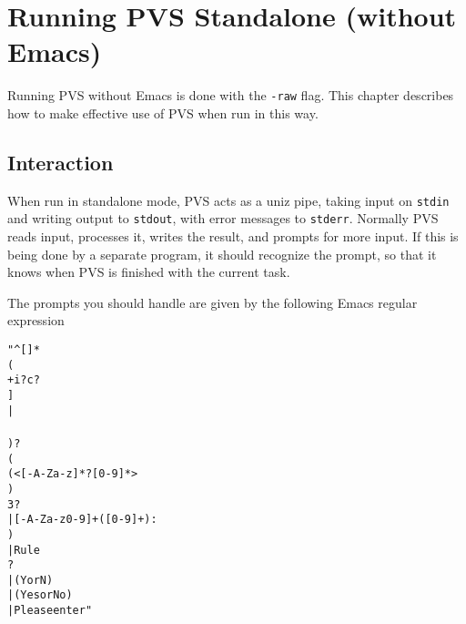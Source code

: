 \chapter{Running PVS Standalone (without Emacs)}

Running PVS without Emacs is done with the \texttt{-raw} flag.  This
chapter describes how to make effective use of PVS when run in this way.

\section{Interaction}

When run in standalone mode, PVS acts as a uniz pipe, taking input on
\texttt{stdin} and writing output to \texttt{stdout}, with error messages
to \texttt{stderr}.  Normally PVS reads input, processes it, writes the
result, and prompts for more input.  If this is being done by a separate
program, it should recognize the prompt, so that it knows when PVS is
finished with the current task.

The prompts you should handle are given by the following Emacs regular
expression
\begin{alltt}
"^[ ]*\\(\\[[0-9]+i?c?\\] \\|\\[step\\] \\)?\\(\\(<[-A-Za-z]* ?[0-9]*> \\)\\3?\\|[-A-Za-z0-9]+([0-9]+): \\)\\|Rule\\? \\|(Y or N)\\|(Yes or No)\\|Please enter"
\end{alltt}

